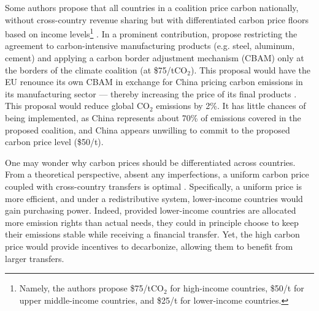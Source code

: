 \documentclass[12pt,english]{article}
\begin{document}
Some authors propose that all countries in a coalition price carbon nationally, without cross-country revenue sharing but with differentiated carbon price floors based on income levels\footnote{Namely, the authors propose \$75/tCO$_\text{2}$ for high-income countries, \$50/t for upper middle-income countries, and \$25/t for lower-income countries.} \citep{parry_proposal_2021,wolfram_building_2025}. %
In a prominent contribution, \cite{wolfram_building_2025} propose restricting the agreement to carbon-intensive manufacturing products (e.g. steel, aluminum, cement) and applying a carbon border adjustment mechanism (CBAM) only at the borders of the climate coalition (at \$75/tCO$_\text{2}$). This proposal would have the EU renounce its own CBAM in exchange for China pricing carbon emissions in its manufacturing sector --- thereby increasing the price of its final products \citep{chateau_global_2024}. This proposal would reduce global CO$_\text{2}$ emissions by 2\%. It has little chances of being implemented, as China represents about 70\% of emissions covered in the proposed coalition, and China appears unwilling to commit to the proposed carbon price level (\$50/t). 

One may wonder why carbon prices should be differentiated across countries. 
From a theoretical perspective, absent any imperfections, a uniform carbon price coupled with cross-country transfers is optimal \citep{aldy_promise_2012}. %
Specifically, a uniform price is more efficient, and under a redistributive system, %
lower-income countries would gain purchasing power. %
Indeed, provided lower-income countries are allocated more emission rights than actual needs, they could in principle choose to keep their emissions stable while receiving
a financial transfer. Yet, the high carbon price would provide incentives to decarbonize, allowing them to benefit from larger transfers. 
\end{document}
